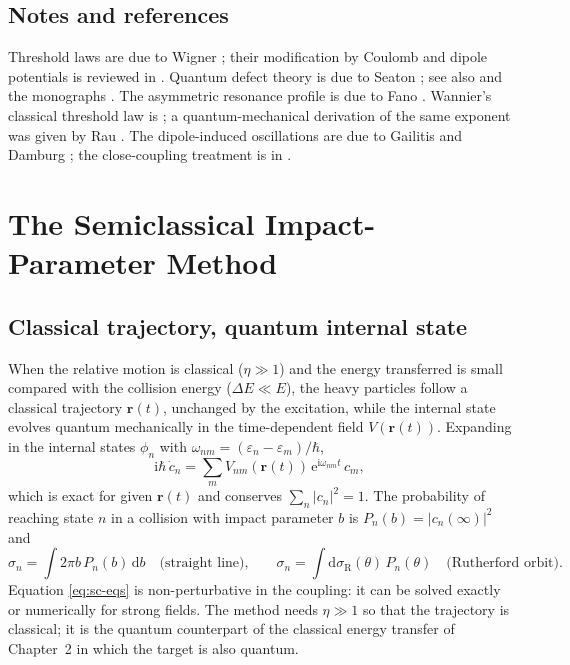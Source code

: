 \documentclass[11pt,a4paper]{book}
\numberwithin{equation}{chapter}
\newcommand{\dd}{\mathrm{d}}
\newcommand{\ii}{\mathrm{i}}
\newcommand{\ee}{\mathrm{e}}
\newcommand{\vr}{\bm{r}}
\begin{document}
\section*{Notes and references}
Threshold laws are due to Wigner \cite{Wigner48}; their modification by Coulomb and dipole potentials is reviewed in \cite{Sadeghpour00}. Quantum defect theory is due to Seaton \cite{Seaton58,Seaton83}; see also \cite{Fano70,GFS79,GRF82} and the monographs \cite{FanoRau,Gallagher}. The asymmetric resonance profile is due to Fano \cite{Fano61}. Wannier's classical threshold law is \cite{Wannier53}; a quantum-mechanical derivation of the same exponent was given by Rau \cite{Rau71}. The dipole-induced oscillations are due to Gailitis and Damburg \cite{GD63}; the close-coupling treatment is in \cite{Burke}.

\chapter{The Semiclassical Impact-Parameter Method}

\section{Classical trajectory, quantum internal state}

When the relative motion is classical ($\eta\gg1$) and the energy transferred is
small compared with the collision energy ($\Delta E\ll E$), the heavy particles
follow a classical trajectory $\vr(t)$, unchanged by the excitation, while the
internal state evolves quantum mechanically in the time-dependent field
$V(\vr(t))$. Expanding in the internal states $\phi_n$ with
$\omega_{nm}=(\varepsilon_n-\varepsilon_m)/\hbar$,
\begin{equation}\label{eq:sc-eqs}
  \ii\hbar\,\dot c_n=\sum_mV_{nm}(\vr(t))\,\ee^{\ii\omega_{nm}t}\,c_m ,
\end{equation}
which is exact for given $\vr(t)$ and conserves $\sum_n|c_n|^2=1$. The
probability of reaching state $n$ in a collision with impact parameter $b$ is
$P_n(b)=|c_n(\infty)|^2$ and
\begin{equation}\label{eq:sc-xs}
  \sigma_n=\int2\pi b\,P_n(b)\,\dd b\quad\text{(straight line),}\qquad
  \sigma_n=\int\dd\sigma_{\mathrm{R}}(\theta)\,P_n(\theta)\quad\text{(Rutherford orbit).}
\end{equation}
Equation \eqref{eq:sc-eqs} is non-perturbative in the coupling: it can be solved
exactly or numerically for strong fields. The method needs $\eta\gg1$ so that the
trajectory is classical; it is the quantum counterpart of the classical energy
transfer of Chapter~2 in which the target is also quantum.
\end{document}
